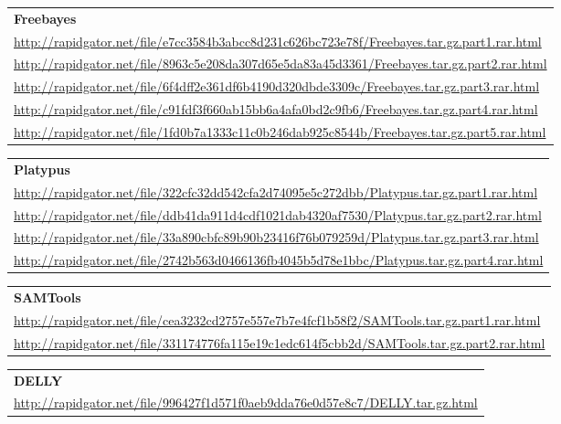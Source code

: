 {\vspace*{1cm}

\noindent
\begin{tabular}{l}
{\bf Freebayes}\\
\url{http://rapidgator.net/file/e7cc3584b3abcc8d231c626bc723e78f/Freebayes.tar.gz.part1.rar.html}\\
\url{http://rapidgator.net/file/8963c5e208da307d65e5da83a45d3361/Freebayes.tar.gz.part2.rar.html}\\
\url{http://rapidgator.net/file/6f4dff2e361df6b4190d320dbde3309c/Freebayes.tar.gz.part3.rar.html}\\
\url{http://rapidgator.net/file/c91fdf3f660ab15bb6a4afa0bd2c9fb6/Freebayes.tar.gz.part4.rar.html}\\
\url{http://rapidgator.net/file/1fd0b7a1333c11c0b246dab925c8544b/Freebayes.tar.gz.part5.rar.html}\\
\end{tabular}

\vspace*{1cm}

\noindent
\begin{tabular}{l}
{\bf Platypus}\\
\url{http://rapidgator.net/file/322cfc32dd542cfa2d74095e5c272dbb/Platypus.tar.gz.part1.rar.html}\\
\url{http://rapidgator.net/file/ddb41da911d4cdf1021dab4320af7530/Platypus.tar.gz.part2.rar.html}\\
\url{http://rapidgator.net/file/33a890cbfc89b90b23416f76b079259d/Platypus.tar.gz.part3.rar.html}\\
\url{http://rapidgator.net/file/2742b563d0466136fb4045b5d78e1bbc/Platypus.tar.gz.part4.rar.html}\\
\end{tabular}


\vspace*{1cm}

\noindent
\begin{tabular}{l}
{\bf SAMTools}\\
\url{http://rapidgator.net/file/cea3232cd2757e557e7b7e4fcf1b58f2/SAMTools.tar.gz.part1.rar.html}\\
\url{http://rapidgator.net/file/331174776fa115e19c1edc614f5cbb2d/SAMTools.tar.gz.part2.rar.html}\\
\end{tabular}

\vspace*{1cm}

\noindent
\begin{tabular}{l}
{\bf DELLY}\\
\url{http://rapidgator.net/file/996427f1d571f0aeb9dda76e0d57e8c7/DELLY.tar.gz.html}\\
\end{tabular}

}
